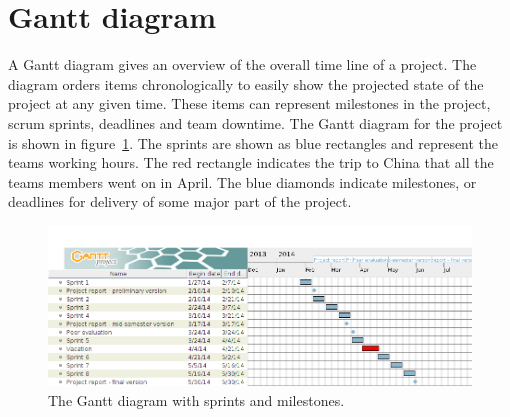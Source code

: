 \section{Gantt diagram}
\label{sec:gantt}

A Gantt diagram gives an overview of the overall time line of a project. The diagram orders items chronologically to easily show the projected state of the project at any given time. These items can represent milestones in the project, scrum sprints, deadlines and team downtime. 
The Gantt diagram for the project is shown in figure~\ref{fig:gantt}. The sprints are shown as blue rectangles and represent the teams working hours. The red rectangle indicates the trip to China that all the teams members went on in April. The blue diamonds indicate milestones, or deadlines for delivery of some major part of the project.


\begin{figure}[H]
\includegraphics[width=\textwidth]{ch/prestudy/fig/gantt.png}
\caption{The Gantt diagram with sprints and milestones.}
\label{fig:gantt}
\end{figure}
